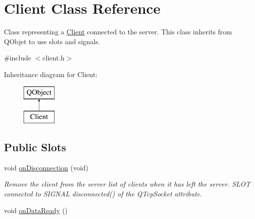 \hypertarget{class_client}{\section{Client Class Reference}
\label{class_client}
}


Class representing a \hyperlink{class_client}{Client} connected to the server. This class inherits from Q\-Objet to use slots and signals.  




{\ttfamily \#include $<$client.\-h$>$}

Inheritance diagram for Client\-:\begin{figure}[H]
\begin{center}
\leavevmode
\includegraphics[height=2.000000cm]{class_client}
\end{center}
\end{figure}
\subsection*{Public Slots}
\begin{DoxyCompactItemize}
\item 
\hypertarget{class_client_a867ed29a467894512410b157888c5c15}{void \hyperlink{class_client_a867ed29a467894512410b157888c5c15}{on\-Disconnection} (void)}\label{class_client_a867ed29a467894512410b157888c5c15}

\begin{DoxyCompactList}\small\item\em Remove the client from the server list of clients when it has left the server. S\-L\-O\-T connected to S\-I\-G\-N\-A\-L disconnected() of the Q\-Tcp\-Socket attribute. \end{DoxyCompactList}\item 
void \hyperlink{class_client_a82a0605f81febec1660a250cac484442}{on\-Data\-Ready} ()
\end{DoxyCompactItemize}
